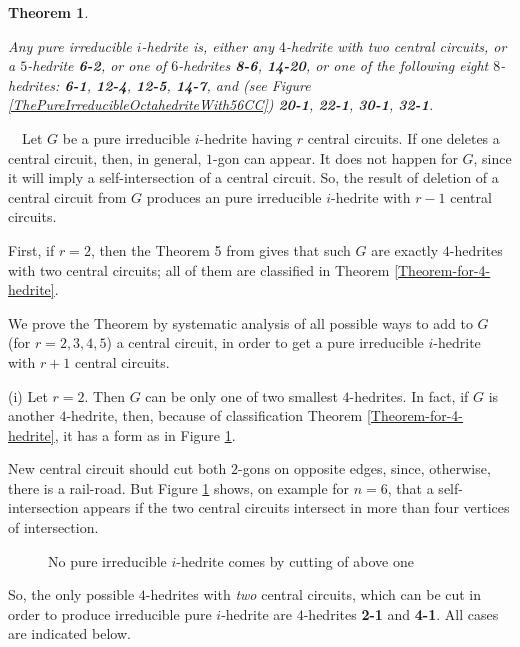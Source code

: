 \documentclass[12pt]{article}
\newtheorem{theorem}{Theorem}
\newcommand{\proof}{\noindent{\bf Proof.}\ \ }
\begin{document}
\begin{theorem}\label{TheOneWithSimpleCentralCircuit}

Any pure irreducible $i$-hedrite is, either any $4$-hedrite with two
central circuits, or a $5$-hedrite {\bf 6-2}, or one of $6$-hedrites
{\bf 8-6}, {\bf 14-20}, or one of the following eight $8$-hedrites:
{\bf 6-1}, {\bf 12-4}, {\bf 12-5}, {\bf 14-7}, and (see Figure 
\ref{ThePureIrreducibleOctahedriteWith56CC}) {\bf 20-1}, {\bf 22-1},
{\bf 30-1}, {\bf 32-1}.


\end{theorem}


\proof Let $G$ be a pure irreducible $i$-hedrite having $r$ central circuits. 
If one deletes a central circuit, then, in general, $1$-gon can appear. It 
does not happen for $G$, since it will imply a self-intersection of a central 
circuit. So, the result of deletion of a central circuit from $G$ 
produces an pure irreducible $i$-hedrite with $r-1$ central circuits.

First, if $r=2$, then the Theorem 5 from \cite{DSt} gives that such $G$ are 
exactly $4$-hedrites with two central circuits; all of them are classified 
in Theorem \ref{Theorem-for-4-hedrite}.

We prove the Theorem by systematic analysis of all possible ways to add 
to $G$ (for $r=2,3,4,5$) a central circuit, in order to get a pure 
irreducible $i$-hedrite with $r+1$ central circuits. 


(i) Let $r=2$. Then $G$ can be only one of two smallest $4$-hedrites. In 
fact, if $G$ is another $4$-hedrite, then, because of classification Theorem 
\ref{Theorem-for-4-hedrite}, it has a form as in Figure \ref{Cutting4hedrite}.

New central circuit should cut both $2$-gons on opposite edges, since, otherwise, there is a rail-road. But Figure \ref{Cutting4hedrite} shows, on example for $n=6$, that a self-intersection appears if the two central circuits intersect in more than four vertices of intersection.


\begin{figure}
\centering
\epsfxsize=55mm
\caption{No pure irreducible $i$-hedrite comes by cutting of above one}
\label{Cutting4hedrite}
\end{figure}



So, the only possible $4$-hedrites with {\em two} central circuits,
which can be cut in order to produce irreducible pure $i$-hedrite
are $4$-hedrites {\bf 2-1} and {\bf 4-1}. All cases are indicated below. 
\end{document}
